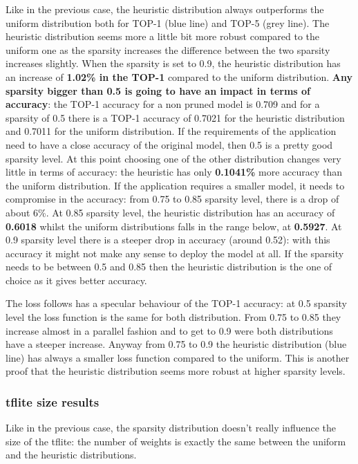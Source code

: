 Like in the previous case, the heuristic distribution always outperforms the
uniform distribution both for TOP-1 (blue line) and TOP-5 (grey line).
The heuristic distribution seems more a little bit more robust compared to the
uniform one as the sparsity increases the difference between the two sparsity
increases slightly.
When the sparsity is set to 0.9, the heuristic distribution has an increase of
\textbf{1.02\% in the TOP-1} compared to the uniform distribution.
\textbf{Any sparsity bigger than 0.5 is going to have an impact in terms of
accuracy}: the TOP-1 accuracy for a non pruned model is 0.709 and for a
sparsity of 0.5 there is a TOP-1 accuracy of 0.7021 for the heuristic
distribution and 0.7011 for the uniform distribution.
If the requirements of the application need to have a close accuracy of the
original model, then 0.5 is a pretty good sparsity level. At this point
choosing one of the other distribution changes very little in terms of
accuracy: the heuristic has only \textbf{0.1041\%} more accuracy than the
uniform distribution.
If the application requires a smaller model, it needs to compromise in the
accuracy: from 0.75 to 0.85 sparsity level, there is a drop of about 6\%.
At 0.85 sparsity level, the heuristic distribution has an accuracy of
\textbf{0.6018} whilst the uniform distributions falls in the range below, at
\textbf{0.5927}.
At 0.9 sparsity level there is a steeper drop in accuracy (around 0.52): with
this accuracy it might not make any sense to deploy the model at all.
If the sparsity needs to be between 0.5 and 0.85 then the heuristic
distribution is the one of choice as it gives better accuracy.

The loss follows has a specular behaviour of the TOP-1 accuracy: at 0.5
sparsity level the loss function is the same for both distribution.
From 0.75 to 0.85 they increase almost in a parallel fashion and to get to 0.9
were both distributions have a steeper increase.
Anyway from 0.75 to 0.9 the heuristic distribution (blue line) has always a
smaller loss function compared to the uniform.
This is another proof that the heuristic distribution seems more robust at
higher sparsity levels.

\subsubsection{tflite size results}
Like in the previous case, the sparsity distribution doesn't really influence
the size of the tflite: the number of weights is exactly the same between the
uniform and the heuristic distributions.

